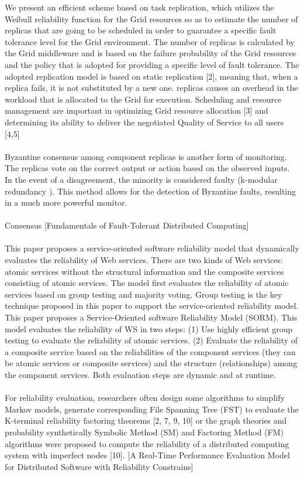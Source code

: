\documentclass{cslthse-msc}
\begin{document}
We present an efficient scheme based on task replication, which utilizes the Weibull reliability function for the Grid resources so as to estimate the number of replicas that are going to be scheduled in order to guarantee a specific fault tolerance level for the Grid environment. The number of replicas is calculated by the Grid middleware and is based on the failure probability of the Grid resources and the policy that is adopted for providing a specific level of fault tolerance. The adopted replication model is based on static replication [2], meaning that, when a replica fails, it is not substituted by a new one. replicas causes an overhead in the workload that is allocated to the Grid for execution. Scheduling and resource management are important in optimizing Grid resource allocation [3] and determining its ability to deliver the negotiated Quality of Service to all users [4,5] \cite{effTaskReplMobGrid}
\\\\
Byzantine consensus among component replicas is another form of monitoring. The replicas vote on the correct output or action based on the observed inputs. In the event of a disagreement, the minority is considered faulty (k-modular redundancy \cite{selfAdaptRel}). This method allows for the detection of Byzantine faults, resulting in a much more powerful monitor.  \cite{surveyFaultParallel}
\\\\
Consensus [Fundamentals of Fault-Tolerant Distributed Computing]
\\\\
This paper proposes a service-oriented software reliability model that dynamically evaluates the reliability of Web services. There are two kinds of Web services: atomic services without the structural information and the composite services consisting of atomic services. The model first evaluates the reliability of atomic services based on group testing and majority voting. Group testing is the key technique proposed in this paper to support the service-oriented reliability model.
This paper proposes a Service-Oriented software Reliability Model (SORM). This model evaluates the reliability of WS in two steps: (1) Use highly efficient group testing to evaluate the reliability of atomic services.
(2) Evaluate the reliability of a composite service based on the reliabilities of the component services (they can be atomic services or composite services) and the structure (relationships) among the component services. Both evaluation steps are dynamic and at runtime. \cite{softwareRelModel}
\\\\
For reliability evaluation, researchers often design some algorithms to simplify Markov models, generate corresponding File Spanning Tree (FST) to evaluate the K-terminal reliability factoring theorems [2, 7, 9, 10] or the graph theories and probability synthetically 
Symbolic Method (SM) and Factoring Method (FM) algorithms were proposed to compute the reliability of a distributed computing system with imperfect nodes [10].
[A Real-Time Performance Evaluation Model for Distributed Software with Reliability Constrains]
\cite{taskSchedulingReplication}
\fi %
\end{document}
